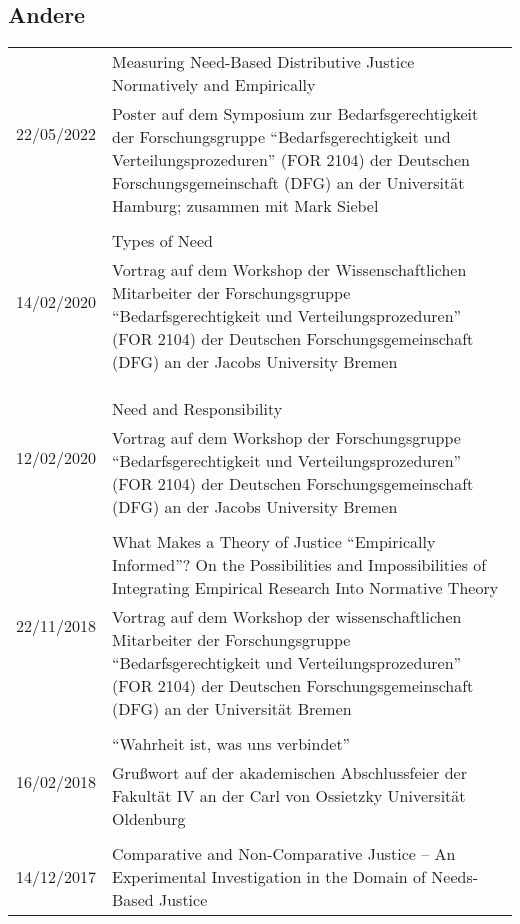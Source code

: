 \documentclass[a4paper,10pt]{article}
\begin{document}
\subsection*{Andere}
\begin{longtable}{p{2cm}p{}}
\multirow{2}{2cm}{\footnotesize{22/05/2022}} & Measuring Need-Based Distributive Justice Normatively and Empirically\\
& \footnotesize{Poster auf dem Symposium zur Bedarfsgerechtigkeit der Forschungsgruppe \enquote{Bedarfsgerechtigkeit und Verteilungsprozeduren} (FOR 2104) der Deutschen Forschungsgemeinschaft (DFG) an der Universität Hamburg; zusammen mit Mark Siebel}\\
\\
\multirow{2}{2cm}{\footnotesize{14/02/2020}} & Types of Need\\
& \footnotesize{Vortrag auf dem Workshop der Wissenschaftlichen Mitarbeiter der Forschungsgruppe \enquote{Bedarfsgerechtigkeit und Verteilungsprozeduren} (FOR 2104) der Deutschen Forschungsgemeinschaft (DFG) an der Jacobs University Bremen}\\
\\
\\
\\
\multirow{2}{2cm}{\footnotesize{12/02/2020}} & Need and Responsibility\\
& \footnotesize{Vortrag auf dem Workshop der Forschungsgruppe \enquote{Bedarfsgerechtigkeit und Verteilungsprozeduren} (FOR 2104) der Deutschen Forschungsgemeinschaft (DFG) an der Jacobs University Bremen}\\
\\
\multirow{2}{2cm}{\footnotesize{22/11/2018}} & What Makes a Theory of Justice \enquote{Empirically Informed}? On the Possibilities and Impossibilities of Integrating Empirical Research Into Normative Theory\\
& \footnotesize{Vortrag auf dem Workshop der wissenschaftlichen Mitarbeiter der Forschungsgruppe \enquote{Bedarfsgerechtigkeit und Verteilungsprozeduren} (FOR 2104) der Deutschen Forschungsgemeinschaft (DFG) an der Universität Bremen}\\
\\
\multirow{2}{2cm}{\footnotesize{16/02/2018}} & \enquote{Wahrheit ist, was uns verbindet}\\
& \footnotesize{Grußwort auf der akademischen Abschlussfeier der Fakultät IV an der Carl von Ossietzky Universität Oldenburg}\\
\\
\multirow{2}{2cm}{\footnotesize{14/12/2017}} & Comparative and Non-Comparative Justice -- An Experimental Investigation in the Domain of Needs-Based Justice\\

\end{longtable}
\end{document}
